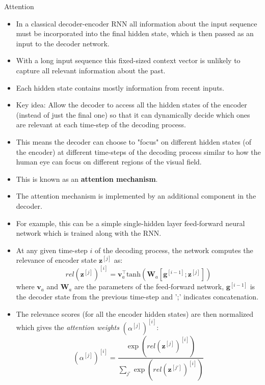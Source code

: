\begin{vbframe}{Attention}
  \begin{itemize}
    \item In a classical decoder-encoder RNN all information about the input sequence must be incorporated into the final hidden state, which is then passed as an input to the decoder network.
    \item With a long input sequence this fixed-sized context vector is unlikely to capture all relevant information about the past.
      \item Each hidden state contains mostly information from recent inputs. 
      \item Key idea: Allow the decoder to access all the hidden states of the encoder (instead of just the final one) so that it can dynamically decide which ones are relevant at each time-step of the decoding process.
      \item This means the decoder can choose to "focus" on different hidden states (of the encoder) at different time-steps of the decoding process similar to how the human eye can focus on different regions of the visual field.
      \item This is known as an \textbf{attention mechanism}.
   \end{itemize}
   
   \framebreak
   
   \begin{itemize}
      \item The attention mechanism is implemented by an additional component in the decoder.
      \item For example, this can be a simple single-hidden layer feed-forward neural network which is trained along with the RNN.
      \item At any given time-step $i$ of the decoding process, the network computes the relevance of encoder state $\bm{z}^{[j]}$ as:
            $$ rel(\bm{z}^{[j]})^{[i]} = \bm{v}_a^\top \text{tanh} (\bm{W}_a[\bm{g}^{[i-1]};\bm{z}^{[j]}]) $$
            where $\bm{v}_a$ and $\bm{W}_a$ are the parameters of the feed-forward network, $\bm{g}^{[i-1]}$ is the decoder state from the previous time-step and ';' indicates concatenation.
      \item The relevance scores (for all the encoder hidden states) are then normalized which gives the \textit{attention weights} $(\alpha^{[j]})^{[i]}$:      
        $$ (\alpha^{[j]})^{[i]} = \frac{\exp (rel(\bm{z}^{[j]})^{[i]})}{\sum_{j'} \exp(rel(\bm{z}^{[j']})^{[i]})} $$
   \end{itemize}
   

\end{vbframe}
